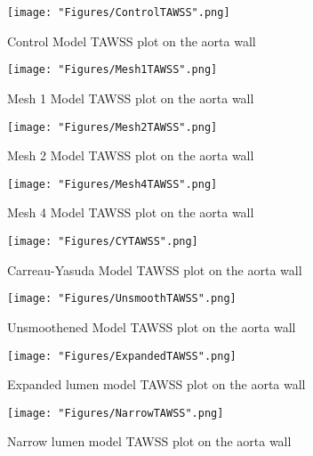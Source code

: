{}


\appendix
\label{appendix1}

\begin{figure}[ht!]
    \centering
    \texttt{[image: "Figures/ControlTAWSS".png]}
    \caption{Control Model TAWSS plot on the aorta wall}
    \label{fig:TAWSS3Dcontrol}
\end{figure}
\begin{figure}[ht!]
    \centering
    \texttt{[image: "Figures/Mesh1TAWSS".png]}
    \caption{Mesh 1 Model TAWSS plot on the aorta wall}
    \label{fig:TAWSS3DMesh1}
\end{figure}
\begin{figure}[ht!]
    \centering
    \texttt{[image: "Figures/Mesh2TAWSS".png]}
    \caption{Mesh 2 Model TAWSS plot on the aorta wall}
    \label{fig:TAWSS3DMesh2}
\end{figure}
\begin{figure}[ht!]
    \centering
    \texttt{[image: "Figures/Mesh4TAWSS".png]}
    \caption{Mesh 4 Model TAWSS plot on the aorta wall}
    \label{fig:TAWSS3DMesh4}
\end{figure}
\begin{figure}[ht!]
    \centering
    \texttt{[image: "Figures/CYTAWSS".png]}
    \caption{Carreau-Yasuda Model TAWSS plot on the aorta wall}
    \label{fig:TAWSS3DVis}
\end{figure}
\begin{figure}[ht!]
    \centering
    \texttt{[image: "Figures/UnsmoothTAWSS".png]}
    \caption{Unsmoothened Model TAWSS plot on the aorta wall}
    \label{fig:TAWSS3DImg}
\end{figure}
\begin{figure}[ht!]
    \centering
    \texttt{[image: "Figures/ExpandedTAWSS".png]}
    \caption{Expanded lumen model TAWSS plot on the aorta wall}
    \label{fig:TAWSS3DGeo1}
\end{figure}
\begin{figure}[ht!]
    \centering
    \texttt{[image: "Figures/NarrowTAWSS".png]}
    \caption{Narrow lumen model TAWSS plot on the aorta wall}
    \label{fig:TAWSS3DGeo2}
\end{figure}


